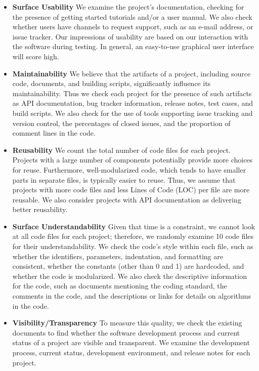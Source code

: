 \documentclass[final, 3p, times, authoryear]{elsarticle}
\begin{document}
\begin{itemize}
\item \textbf{Surface Usability} We examine the project's documentation,
checking for the presence of getting started tutorials and/or a user manual. We
also check whether users have channels to request support, such as an e-mail
address, or issue tracker. Our impressions of usability are based on our
interaction with the software during testing.  In general, an easy-to-use
graphical user interface will score high.

\item \textbf{Maintainability} We believe that the artifacts of a project,
including source code, documents, and building scripts, significantly influence
its maintainability. Thus we check each project for the presence of such
artifacts as API documentation, bug tracker information, release notes, test
cases, and build scripts. We also check for the use of tools supporting issue
tracking and version control, the percentages of closed issues, and the
proportion of comment lines in the code.

\item \textbf{Reusability} We count the total number of code files for each
project. Projects with a large number of components potentially provide more
choices for reuse. Furthermore, well-modularized code, which tends to have
smaller parts in separate files, is typically easier to reuse. Thus, we assume
that projects with more code files and less Lines of Code (LOC) per file are
more reusable. We also consider projects with API documentation as delivering
better reusability.

\item \textbf{Surface Understandability} Given that time is a constraint, we
cannot look at all code files for each project; therefore, we randomly examine
10 code files for their understandability. We check the code's style within each
file, such as whether the identifiers, parameters, indentation, and formatting
are consistent, whether the constants (other than 0 and 1) are hardcoded, and
whether the code is modularized. We also check the descriptive information for
the code, such as documents mentioning the coding standard, the comments in the
code, and the descriptions or links for details on algorithms in the code. 

\item \textbf{Visibility/Transparency} To measure this quality, we check the
existing documents to find whether the software development process and
current status of a project are visible and transparent. We examine the
development process, current status, development environment, and release notes
for each project.
\end{itemize}
\end{document}
